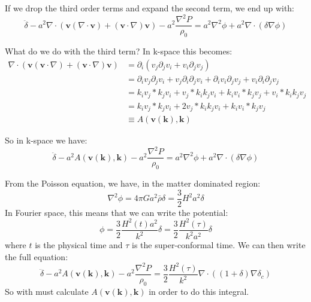 \documentclass{article}
\begin{document}
If we drop the third order terms and expand the second term, we end
up with:
\begin{equation}
  \ddot{\delta} - a^2 \nabla \cdot ( \mathbf{v} ( \nabla \cdot
  \mathbf{v} ) + ( \mathbf{v} \cdot \nabla ) \mathbf{v} ) - a^2
  \frac{\nabla^2 P}{\rho_0} = a^2 \nabla^2 \phi + a^2 \nabla \cdot ( \delta
  \nabla \phi) 
\end{equation}

What do we do with the third term? In k-space this becomes:
\begin{align*}
  \nabla \cdot ( \mathbf{v} (\mathbf{v} \cdot \nabla ) + ( \mathbf{v}
  \cdot \nabla ) \mathbf{v} ) &= \partial_i ( v_j \partial_j v_i +
                                v_i \partial_j v_j ) \\
  &= \partial_i v_j \partial_j v_i + v_j \partial_i \partial_j v_i
    + \partial_i v_i \partial_j v_j + v_i \partial_i \partial_j v_j \\
  &= k_i v_j \ast k_j v_i + v_j \ast k_i k_j v_i + k_i v_i \ast k_j
    v_j + v_i \ast k_i k_j v_j \\
  &= k_i v_j \ast k_j v_i + 2 v_j \ast k_i k_j v_i + k_i v_i \ast k_j
    v_j  \\
  &\equiv A(\mathbf{v}(\mathbf{k}),\mathbf{k})
\end{align*} 

So in k-space we have:
\begin{equation}
  \ddot{\delta} - a^2 A(\mathbf{v}(\mathbf{k}),\mathbf{k}) - a^2
  \frac{\nabla^2 P }{\rho_0} = a^2 \nabla^2 \phi + a^2 \nabla \cdot(
  \delta \nabla \phi)
\end{equation}

From the Poisson equation, we have, in the matter dominated region:
\begin{equation}
  \nabla^2 \phi = 4 \pi G a^2 \bar{\rho}\delta = \frac{3}{2} H^2
  a^2 \delta 
\end{equation}
In Fourier space, this means that we can write the potential:
\begin{equation}
  \phi = \frac{3}{2} \frac{H^2(t)a^2}{k^2} \delta = \frac{3}{2}
  \frac{H^2(\tau) }{k^2 a^2} \delta 
\end{equation}
where $t$ is the physical time and $\tau$ is the super-conformal
time.  We can then write the full equation:
\begin{equation}
  \ddot{\delta} - a^2 A(\mathbf{v}(\mathbf{k}),\mathbf{k}) - a^2
  \frac{\nabla^2 P }{\rho_0} = \frac{3}{2} \frac{H^2(\tau)}{k^2} \nabla \cdot((1+
  \delta) \nabla \delta_c)
\end{equation}
So with must calculate $A(\mathbf{v}(\mathbf{k}),\mathbf{k})$ in order
to do this integral.
\end{document}
